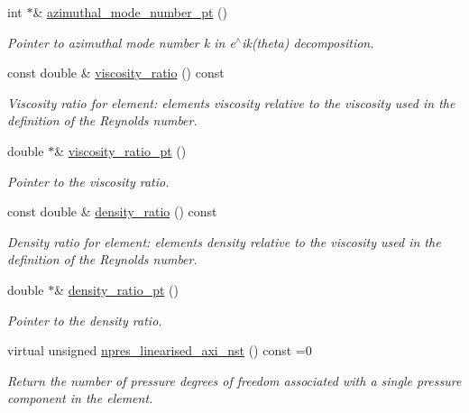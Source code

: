 \begin{DoxyCompactItemize}
int $\ast$\& \hyperlink{classoomph_1_1LinearisedAxisymmetricNavierStokesEquations_a0f4127817e33091a62a0a48c7968cb44}{azimuthal\+\_\+mode\+\_\+number\+\_\+pt} ()
\begin{DoxyCompactList}\small\item\em Pointer to azimuthal mode number k in e$^\wedge$ik(theta) decomposition. \end{DoxyCompactList}\item 
const double \& \hyperlink{classoomph_1_1LinearisedAxisymmetricNavierStokesEquations_a385f3354d6afc7f455c4f1a31d7ec64b}{viscosity\+\_\+ratio} () const
\begin{DoxyCompactList}\small\item\em Viscosity ratio for element\+: element\textquotesingle{}s viscosity relative to the viscosity used in the definition of the Reynolds number. \end{DoxyCompactList}\item 
double $\ast$\& \hyperlink{classoomph_1_1LinearisedAxisymmetricNavierStokesEquations_a8c4e697a9b821bc42caba8edb3a48417}{viscosity\+\_\+ratio\+\_\+pt} ()
\begin{DoxyCompactList}\small\item\em Pointer to the viscosity ratio. \end{DoxyCompactList}\item 
const double \& \hyperlink{classoomph_1_1LinearisedAxisymmetricNavierStokesEquations_abfd14996e38befacef3d7c912ebc2d1f}{density\+\_\+ratio} () const
\begin{DoxyCompactList}\small\item\em Density ratio for element\+: element\textquotesingle{}s density relative to the viscosity used in the definition of the Reynolds number. \end{DoxyCompactList}\item 
double $\ast$\& \hyperlink{classoomph_1_1LinearisedAxisymmetricNavierStokesEquations_a35ae96c21efc8d98cd2b62e46d356bef}{density\+\_\+ratio\+\_\+pt} ()
\begin{DoxyCompactList}\small\item\em Pointer to the density ratio. \end{DoxyCompactList}\item 
virtual unsigned \hyperlink{classoomph_1_1LinearisedAxisymmetricNavierStokesEquations_aad6f1582b4516aae4fe0ce3c9e2d16c2}{npres\+\_\+linearised\+\_\+axi\+\_\+nst} () const =0
\begin{DoxyCompactList}\small\item\em Return the number of pressure degrees of freedom associated with a single pressure component in the element. \end{DoxyCompactList}\item 

\end{DoxyCompactItemize}
